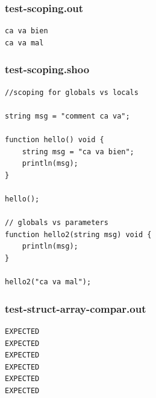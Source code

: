 \documentclass[12pt]{article}
\begin{document}
\subsubsection{test-scoping.out}
\begin{mdframed}[hidealllines=true,backgroundcolor=green!10]
\begin{lstlisting}
ca va bien
ca va mal\end{lstlisting}
\end{mdframed}
\subsubsection{test-scoping.shoo}
\begin{mdframed}[hidealllines=true,backgroundcolor=blue!10]
\begin{lstlisting}
//scoping for globals vs locals

string msg = "comment ca va";

function hello() void {
	string msg = "ca va bien";
	println(msg);
}

hello();

// globals vs parameters
function hello2(string msg) void {
	println(msg);
}

hello2("ca va mal");\end{lstlisting}
\end{mdframed}
\subsubsection{test-struct-array-compar.out}
\begin{mdframed}[hidealllines=true,backgroundcolor=green!10]
\begin{lstlisting}
EXPECTED
EXPECTED
EXPECTED
EXPECTED
EXPECTED
EXPECTED\end{lstlisting}
\end{mdframed}
\end{document}
